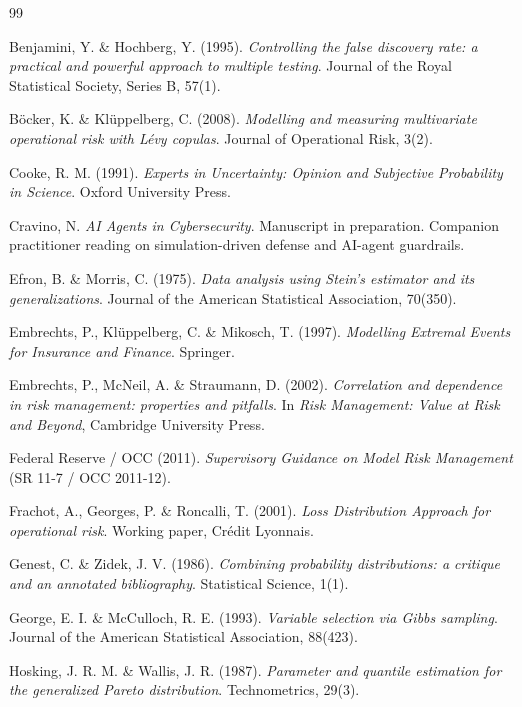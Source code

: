 \documentclass[11pt]{article}
\begin{document}
\begin{thebibliography}{99}

Benjamini, Y. \& Hochberg, Y. (1995).
\textit{Controlling the false discovery rate: a practical and powerful
approach to multiple testing}. Journal of the Royal Statistical Society,
Series B, 57(1).

B\"ocker, K. \& Kl\"uppelberg, C. (2008).
\textit{Modelling and measuring multivariate operational risk with L\'evy
copulas}. Journal of Operational Risk, 3(2).

Cooke, R. M. (1991).
\textit{Experts in Uncertainty: Opinion and Subjective Probability in
Science}. Oxford University Press.

Cravino, N.
\textit{AI Agents in Cybersecurity}. Manuscript in preparation. Companion
practitioner reading on simulation-driven defense and AI-agent guardrails.

Efron, B. \& Morris, C. (1975).
\textit{Data analysis using Stein's estimator and its generalizations}.
Journal of the American Statistical Association, 70(350).

Embrechts, P., Kl\"uppelberg, C. \& Mikosch, T. (1997).
\textit{Modelling Extremal Events for Insurance and Finance}. Springer.

Embrechts, P., McNeil, A. \& Straumann, D. (2002).
\textit{Correlation and dependence in risk management: properties and
pitfalls}. In \textit{Risk Management: Value at Risk and Beyond}, Cambridge
University Press.

Federal Reserve / OCC (2011).
\textit{Supervisory Guidance on Model Risk Management} (SR 11-7 / OCC
2011-12).

Frachot, A., Georges, P. \& Roncalli, T. (2001).
\textit{Loss Distribution Approach for operational risk}. Working paper,
Cr\'edit Lyonnais.

Genest, C. \& Zidek, J. V. (1986).
\textit{Combining probability distributions: a critique and an annotated
bibliography}. Statistical Science, 1(1).

George, E. I. \& McCulloch, R. E. (1993).
\textit{Variable selection via Gibbs sampling}. Journal of the American
Statistical Association, 88(423).

Hosking, J. R. M. \& Wallis, J. R. (1987).
\textit{Parameter and quantile estimation for the generalized Pareto
distribution}. Technometrics, 29(3).


\end{thebibliography}
\end{document}
